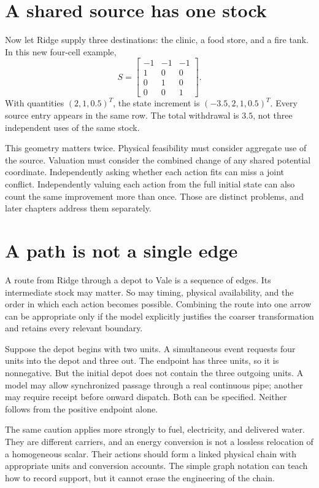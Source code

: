 \section{A shared source has one stock}
Now let Ridge supply three destinations: the clinic, a food store, and a fire tank. In this new four-cell example,
\begin{equation}
 S=\begin{bmatrix}-1&-1&-1\\1&0&0\\0&1&0\\0&0&1\end{bmatrix}.
\end{equation}
With quantities \((2,1,0.5)^T\), the state increment is \((-3.5,2,1,0.5)^T\). Every source entry appears in the same row. The total withdrawal is \(3.5\), not three independent uses of the same stock.

This geometry matters twice. Physical feasibility must consider aggregate use of the source. Valuation must consider the combined change of any shared potential coordinate. Independently asking whether each action fits can miss a joint conflict. Independently valuing each action from the full initial state can also count the same improvement more than once. Those are distinct problems, and later chapters address them separately.

\section{A path is not a single edge}
A route from Ridge through a depot to Vale is a sequence of edges. Its intermediate stock may matter. So may timing, physical availability, and the order in which each action becomes possible. Combining the route into one arrow can be appropriate only if the model explicitly justifies the coarser transformation and retains every relevant boundary.

Suppose the depot begins with two units. A simultaneous event requests four units into the depot and three out. The endpoint has three units, so it is nonnegative. But the initial depot does not contain the three outgoing units. A model may allow synchronized passage through a real continuous pipe; another may require receipt before onward dispatch. Both can be specified. Neither follows from the positive endpoint alone.

The same caution applies more strongly to fuel, electricity, and delivered water. They are different carriers, and an energy conversion is not a lossless relocation of a homogeneous scalar. Their actions should form a linked physical chain with appropriate units and conversion accounts. The simple graph notation can teach how to record support, but it cannot erase the engineering of the chain.

